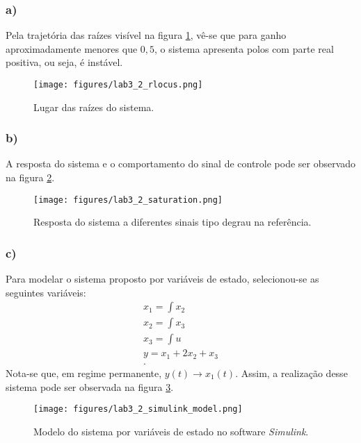 \documentclass[a4paper]{report}
\begin{document}

\subsubsection*{a)}

Pela trajetória das raízes visível na figura \ref{fig:figures-lab3_2_rlocus-pdf}, vê-se que para ganho aproximadamente menores que $0,5$, o sistema apresenta polos com parte real positiva, ou seja, é instável.

\begin{figure}[H]
    \centering
    \texttt{[image: figures/lab3\_2\_rlocus.png]}
    \caption{Lugar das raízes do sistema.}
    \label{fig:figures-lab3_2_rlocus-pdf}
\end{figure}

\subsubsection*{b)}

A resposta do sistema e o comportamento do sinal de controle pode ser observado na figura \ref{fig:figures-lab3_2_saturation-png}.

\begin{figure}[H]
    \centering
    \texttt{[image: figures/lab3\_2\_saturation.png]}
    \caption{Resposta do sistema a diferentes sinais tipo degrau na referência.}
    \label{fig:figures-lab3_2_saturation-png}
\end{figure}

\subsubsection*{c)}

Para modelar o sistema proposto por variáveis de estado, selecionou-se as seguintes variáveis:
\begin{align*}
    x_1 = \int x_2 \\
    x_2 = \int x_3 \\
    x_3 = \int u \\
    y = x_1 + 2x_2 + x_3 \\
.\end{align*}
Nota-se que, em regime permanente, $y(t)\to x_1(t)$. Assim, a realização desse sistema pode ser observada na figura \ref{fig:figures-lab3_2_simulink_model-png}.

\begin{figure}[H]
    \centering
    \texttt{[image: figures/lab3\_2\_simulink\_model.png]}
    \caption{Modelo do sistema por variáveis de estado no software \emph{Simulink}.}
    \label{fig:figures-lab3_2_simulink_model-png}
\end{figure}
\end{document}

